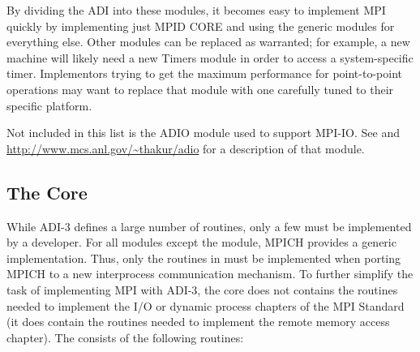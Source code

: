 \documentclass{article}
\begin{document}
By dividing the ADI into these modules, it becomes easy to implement
MPI quickly by implementing just MPID CORE and using the generic
modules for everything else.  Other modules can be replaced as
warranted; for example, a new machine will likely need a new Timers
module in order to access a system-specific timer.  Implementors
trying to get the maximum performance for point-to-point operations
may want to replace that module with one carefully tuned to their
specific platform.

Not included in this list is the ADIO module used to support MPI-IO.
See \cite{ThakurGroLus96} and \url{http://www.mcs.anl.gov/~thakur/adio} 
for a description of that module.

\subsection{The Core}
\label{sec-minimal}

While ADI-3 defines a large number of routines, only a few must be implemented
by a developer.  For all modules except the  module, MPICH
provides a generic implementation.  Thus, only the routines in
 must be implemented when porting MPICH to a new interprocess
communication mechanism.  To further simplify the task of implementing MPI
with ADI-3, the core does not contains the routines needed to implement the
I/O or dynamic process chapters of the MPI Standard (it does contain the
routines needed to implement the remote memory access chapter).  The
 consists of the following routines:  
\end{document}
